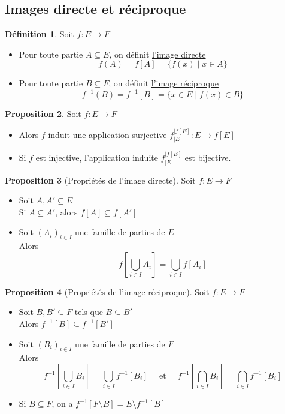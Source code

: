 \documentclass[10pt,a4paper]{article}
\theoremstyle{definition}
\newtheorem{proposition}{Proposition}[section]
\newtheorem{definition}[proposition]{Définition}
\begin{document}
\subsection{Images directe et réciproque}
\begin{definition}
Soit $f: E \to F$
\begin{itemize}
\item Pour toute partie $A \subseteq E$, on définit \uline{l'image directe}
\[ f(A) = f[A] = \{f(x) \mid x \in A \} \]
\item Pour toute partie $B \subseteq F$, on définit \uline{l'image réciproque}
\[ f^{-1}(B) = f^{-1}[B] = \{ x \in E \mid f(x) \in B \} \]
\end{itemize}
\end{definition}
\begin{proposition}
Soit $f: E \to F$
\begin{itemize}
\item Alors $f$ induit une application surjective $f_{|E}^{|f[E]}: E \to f[E]$
\item Si $f$ est injective, l'application induite $f_{|E}^{|f[E]}$ est bijective.
\end{itemize}
\end{proposition}
\begin{proposition}[Propriétés de l'image directe]
Soit $f: E \to F$
\begin{itemize}
\item Soit $A, A' \subseteq E$ \\
Si $A \subseteq A'$, alors $f[A] \subseteq f[A']$
\item Soit $(A_i)_{i \in I}$ une famille de parties de $E$ \\
Alors
\[ f\left[\bigcup\limits_{i \in I} A_i\right] = \bigcup\limits_{i \in I} f[A_i] \]
\end{itemize}
\end{proposition}
\begin{proposition}[Propriétés de l'image réciproque]
Soit $f: E \to F$
\begin{itemize}
\item Soit $B, B' \subseteq F$ tels que $B \subseteq B'$ \\
Alors $f^{-1}[B] \subseteq f^{-1}[B']$
\item Soit $(B_i)_{i \in I}$ une famille de parties de $F$ \\
Alors
\[ f^{-1}\left[\bigcup_{i \in I} B_i\right] = \bigcup_{i \in I} f^{-1}[B_i] \quad \text{ et } \quad f^{-1}\left[\bigcap_{i \in I} B_i\right] = \bigcap_{i \in I}f^{-1}[B_i] \]
\item Si $B \subseteq F$, on a $f^{-1}[F \setminus B] = E \setminus f^{-1}[B]$
\end{itemize}
\end{proposition}
\end{document}
